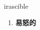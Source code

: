 
\begin{frame}
{\huge irascible}
\begin{center}
\begin{enumerate}\Large
  \item \textbf{易怒的}
\end{enumerate}
\end{center}
\end{frame}
